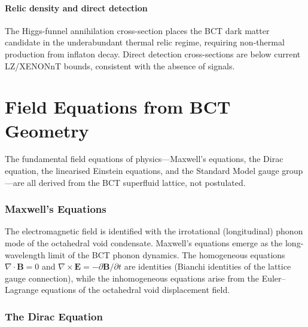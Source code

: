 \documentclass[review,number,sort&compress]{elsarticle}
\begin{document}
\subsection{Relic density and direct detection}

The Higgs-funnel annihilation cross-section places the BCT dark matter
candidate in the underabundant thermal relic regime, requiring
non-thermal production from inflaton decay. Direct detection
cross-sections are below current LZ/XENONnT bounds, consistent with
the absence of signals.



\part{Field Equations from BCT Geometry}
\label{part:fields}

The fundamental field equations of physics---Maxwell's equations, the Dirac
equation, the linearised Einstein equations, and the Standard Model gauge
group---are all derived from the BCT superfluid lattice, not postulated.

\section{Maxwell's Equations}
\label{sec:maxwell}

The electromagnetic field is identified with the irrotational
(longitudinal) phonon mode of the octahedral void condensate. Maxwell's
equations emerge as the long-wavelength limit of the BCT phonon dynamics.
The homogeneous equations $\nabla \cdot \bm{B} = 0$ and
$\nabla \times \bm{E} = -\partial\bm{B}/\partial t$ are identities
(Bianchi identities of the lattice gauge connection), while the
inhomogeneous equations arise from the Euler--Lagrange equations of the
octahedral void displacement field.

\section{The Dirac Equation}
\label{sec:dirac}
\end{document}
